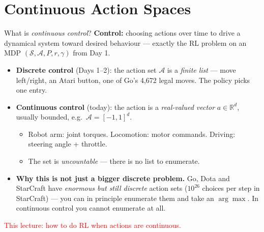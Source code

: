 \section{Continuous Action Spaces}

\begin{frame}{What is \emph{continuous control}?}
\vspace{0.6em}
\textbf{Control:} choosing actions over time to drive a dynamical system toward desired behaviour --- exactly the RL problem on an MDP $(\mathcal{S},\mathcal{A},P,r,\gamma)$ from Day 1.
\vspace{0.6em}
\begin{itemize}
    \item \textbf{Discrete control} (Days 1--2): the action set $\mathcal{A}$ is a \emph{finite list} --- move left/right, an Atari button, one of Go's 4{,}672 legal moves. The policy picks one entry.
    \vspace{0.3em}
    \item \textbf{Continuous control} (today): the action is a \emph{real-valued vector} $a \in \mathbb{R}^{d}$, usually bounded, e.g.\ $\mathcal{A} = [-1,1]^{d}$.
    \begin{itemize}
        \footnotesize
        \item Robot arm: joint torques. \quad Locomotion: motor commands. \quad Driving: steering angle + throttle.
        \item The set is \emph{uncountable} --- there is no list to enumerate.
    \end{itemize}
    \pause
    \vspace{0.5em}
    \item \textbf{Why this is not just a bigger discrete problem.} Go, Dota and StarCraft have \emph{enormous but still discrete} action sets ($10^{26}$ choices per step in StarCraft) --- you can in principle enumerate them and take an $\arg\max$. In continuous control you cannot enumerate at all.
\end{itemize}
\vspace{0.4em}
\centering\footnotesize\textcolor{red}{This lecture: how to do RL when actions are continuous.}
\end{frame}
